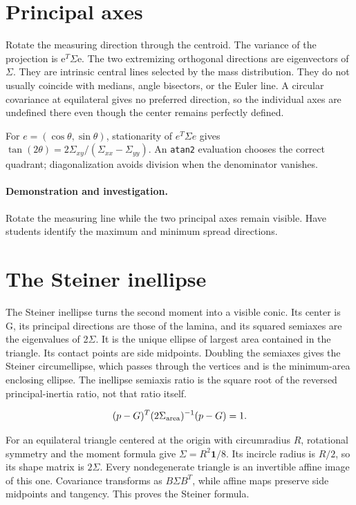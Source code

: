 \documentclass[11pt,oneside,openany]{book}
\begin{document}
\section{Principal axes}\label{sec:slide11}

Rotate the measuring direction through the centroid. The variance of the projection is e\ensuremath{^T}\ensuremath{\Sigma}e. The two extremizing orthogonal directions are eigenvectors of \ensuremath{\Sigma}. They are intrinsic central lines selected by the mass distribution. They do not usually coincide with medians, angle bisectors, or the Euler line. A circular covariance at equilateral gives no preferred direction, so the individual axes are undefined there even though the center remains perfectly defined.


For $e=(\cos\theta,\sin\theta)$, stationarity of $e^T\Sigma e$
gives $\tan(2\theta)=2\Sigma_{xy}/(\Sigma_{xx}-\Sigma_{yy})$.
An \texttt{atan2} evaluation chooses the correct quadrant; diagonalization
avoids division when the denominator vanishes.



\paragraph{Demonstration and investigation.} Rotate the measuring line while the two principal axes remain visible. Have students identify the maximum and minimum spread directions.


\section{The Steiner inellipse}\label{sec:slide12}

The Steiner inellipse turns the second moment into a visible conic. Its center is G, its principal directions are those of the lamina, and its squared semiaxes are the eigenvalues of 2\ensuremath{\Sigma}. It is the unique ellipse of largest area contained in the triangle. Its contact points are side midpoints. Doubling the semiaxes gives the Steiner circumellipse, which passes through the vertices and is the minimum-area enclosing ellipse. The inellipse semiaxis ratio is the square root of the reversed principal-inertia ratio, not that ratio itself.


\[(p-G)^T(2\Sigma_{\rm area})^{-1}(p-G)=1.\]



For an equilateral triangle centered at the origin with circumradius
$R$, rotational symmetry and the moment formula give
$\Sigma=R^2\mathbf1/8$. Its incircle radius is $R/2$,
so its shape matrix is $2\Sigma$. Every nondegenerate triangle is an
invertible affine image of this one. Covariance transforms as
$B\Sigma B^T$, while affine maps preserve side midpoints and tangency.
This proves the Steiner formula.
\end{document}
